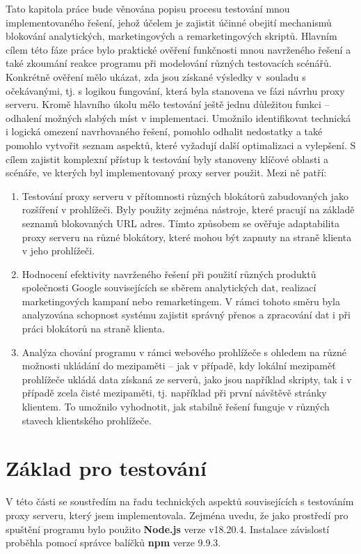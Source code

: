 Tato kapitola práce bude věnována popisu procesu testování mnou implementovaného řešení, jehož účelem je zajistit účinné obejití mechanismů blokování analytických, marketingových a remarketingových skriptů. Hlavním cílem této fáze práce bylo praktické ověření funkčnosti mnou navrženého řešení a také zkoumání reakce programu při modelování různých testovacích scénářů. Konkrétně ověření mělo ukázat, zda jsou získané výsledky v~souladu s očekávanými, tj. s logikou fungování, která byla stanovena ve fázi návrhu proxy serveru. Kromě hlavního úkolu mělo testování ještě jednu důležitou funkci -- odhalení možných slabých míst v implementaci. Umožnilo identifikovat technická i logická omezení navrhovaného řešení, pomohlo odhalit nedostatky a také pomohlo vytvořit seznam aspektů, které vyžadují další optimalizaci a vylepšení. S cílem zajistit komplexní přístup k testování byly stanoveny klíčové oblasti a scénáře, ve kterých byl implementovaný proxy server použit. Mezi ně patří:

\begin{enumerate}
    \item Testování proxy serveru v přítomnosti různých blokátorů zabudovaných jako rozšíření v prohlížeči. Byly použity zejména nástroje, které pracují na základě seznamů blokovaných URL adres. Tímto způsobem se ověřuje adaptabilita proxy serveru na různé blokátory, které mohou být zapnuty na straně klienta v jeho prohlížeči.
    \item Hodnocení efektivity navrženého řešení při použití různých produktů společnosti Google souvisejících se sběrem analytických dat, realizací marketingových kampaní nebo remarketingem. V rámci tohoto směru byla analyzována schopnost systému zajistit správný přenos a zpracování dat i při práci blokátorů na straně klienta.
    \item Analýza chování programu v rámci webového prohlížeče s ohledem na různé možnosti ukládání do mezipaměti -- jak v případě, kdy lokální mezipaměť prohlížeče ukládá data získaná ze serverů, jako jsou například skripty, tak i v případě zcela čisté mezipaměti, tj. například při první návštěvě stránky klientem. To umožnilo vyhodnotit, jak stabilně řešení funguje v různých stavech klientského prohlížeče.
\end{enumerate}

\section{Základ pro testování}
V této části se soustředím na řadu technických aspektů souvisejících s testováním proxy serveru, který jsem implementovala. Zejména uvedu, že jako prostředí pro spuštění programu bylo použito \textbf{Node.js} verze v18.20.4. Instalace závislostí proběhla pomocí správce balíčků \textbf{npm} verze 9.9.3.

